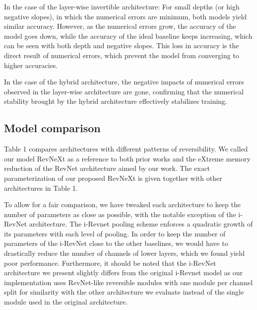 \documentclass[twocolumn]{bmcart}
\begin{document}
In the case of the layer-wise invertible architecture:
For small depths (or high negative slopes), in which the numerical errors are minimum, both models yield similar accuracy.
However, as the numerical errors grow, the accuracy of the model goes down, while the accuracy of the ideal baseline keeps increasing,
which can be seen with both depth and negative slopes. This loss in accuracy is the direct result of numerical errors,
which prevent the model from converging to higher accuracies.

In the case of the hybrid architecture, the negative impacts of numerical errors observed in the layer-wise architecture are gone,
confirming that the numerical stability brought by the hybrid architecture effectively stabilizes training.

\subsection{Model comparison}

Table 1 compares architectures with different patterns of reversibility.
We called our model RevNeXt as a reference to both prior works and
the eXtreme memory reduction of the RevNet architecture aimed by our work.
The exact parameterization of our proposed RevNeXt is given together with other
architectures in Table 1.

To allow for a fair comparison, we have tweaked each architecture to keep the number of parameters as close as possible,
with the notable exception of the i-RevNet architecture.
The i-Revnet pooling scheme enforces a quadratic growth of its parameters with each level of pooling.
In order to keep the number of parameters of the i-RevNet close to the other baselines, we would have to drastically
reduce the number of channels of lower layers, which we found yield poor performance.
Furthermore, it should be noted that the i-RevNet architecture we present slightly differs from the original i-Revnet model
as our implementation uses RevNet-like reversible modules with one module per channel split for similarity with
the other architecture we evaluate instead of the single module used in the original architecture.
\end{document}

